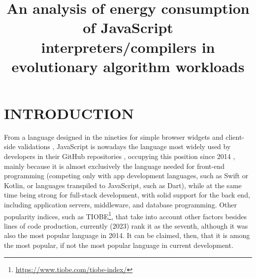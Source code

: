 \documentclass[a4paper,twoside]{article}
\begin{document}
\title{An analysis of energy consumption of JavaScript interpreters/compilers in evolutionary algorithm workloads}

\author{
}


\abstract{
}

\onecolumn \maketitle \normalsize \setcounter{footnote}{0} \vfill

\section{\uppercase{Introduction}}
\label{sec:introduction}



From a language designed in the nineties for simple browser widgets and
client-side validations \cite{goodman2007javascript,flanagan1998javascript},
JavaScript is nowadays the language most widely used by developers in their
GitHub repositories \cite{ogrady22:ranking}, occupying this position since 2014
\cite{ogrady14:ranking}, mainly because it is almost exclusively the language
needed for front-end programming (competing only with app development languages,
such as Swift or Kotlin, or languages transpiled to JavaScript, such as Dart),
while at the same time being strong for full-stack development, with solid
support for the back end, including application servers, middleware, and
database programming. Other popularity indices, such as
TIOBE\footnote{\url{https://www.tiobe.com/tiobe-index/}}, that take into account other
factors besides lines of code production, currently (2023) rank it as the seventh,
although it was also the most popular language in 2014. It can
be claimed, then, that it is among the most popular, if not the most popular
language in current development.
\end{document}
